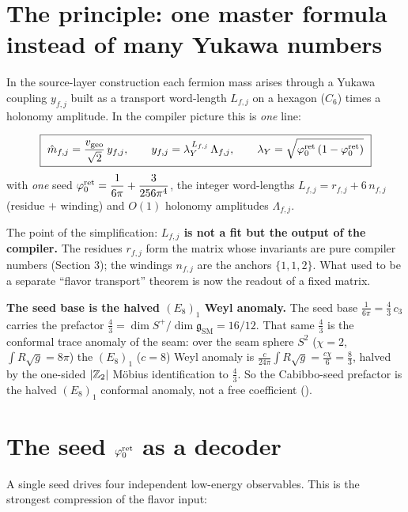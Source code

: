 \section{The principle: one master formula instead of many Yukawa numbers}
In the source-layer construction each fermion mass arises through a Yukawa coupling $y_{f,j}$ built as a transport
word-length $L_{f,j}$ on a hexagon ($C_6$) times a holonomy amplitude. In the compiler picture this is
\emph{one} line:

\begin{keybox}
\[
  \boxed{\ \hat m_{f,j}=\frac{v_{\mathrm{geo}}}{\sqrt2}\,y_{f,j},\qquad
  y_{f,j}=\lambda_Y^{\,L_{f,j}}\,\Lambda_{f,j},\qquad
  \lambda_Y=\sqrt{\varphi_0^{\mathrm{ret}}\,(1-\varphi_0^{\mathrm{ret}})}\ }
\]
with \emph{one} seed $\varphi_0^{\mathrm{ret}}=\dfrac{1}{6\pi}+\dfrac{3}{256\pi^4}$, the integer word-lengths
$L_{f,j}=r_{f,j}+6\,n_{f,j}$ (residue $+$ winding) and $O(1)$ holonomy amplitudes $\Lambda_{f,j}$.
\end{keybox}

\noindent The point of the simplification: \textbf{$L_{f,j}$ is not a fit but the output of the
compiler.} The residues $r_{f,j}$ form the matrix whose invariants are pure compiler numbers
(Section 3); the windings $n_{f,j}$ are the anchors $\{1,1,2\}$. What used to be a separate ``flavor
transport'' theorem is now the readout of a fixed matrix.

\noindent\textbf{The seed base is the halved $(E_8)_1$ Weyl anomaly.} The seed base
$\tfrac1{6\pi}=\tfrac43\,c_3$ carries the prefactor $\tfrac43=\dim S^+/\dim\mathfrak g_{\mathrm{SM}}=16/12$.
That same $\tfrac43$ is the conformal trace anomaly of the seam: over the seam sphere
$S^2$ ($\chi=2$, $\int R\sqrt g=8\pi$) the $(E_8)_1$ ($c=8$) Weyl anomaly is
$\tfrac{c}{24\pi}\!\int\! R\sqrt g=\tfrac{c\chi}{6}=\tfrac83$, halved by the one-sided
$|\mathbb{Z}_2|$ M\"obius identification to $\tfrac43$. So the Cabibbo-seed prefactor is the halved
$(E_8)_1$ conformal anomaly, not a free coefficient ().

\section{The seed $\varphi_0^{\mathrm{ret}}$ as a decoder}
A single seed drives four independent low-energy observables. This is the strongest compression of the
flavor input:

